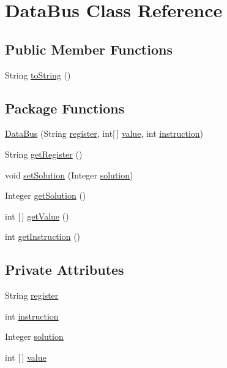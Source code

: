 \hypertarget{class_data_bus}{}\section{Data\+Bus Class Reference}
\label{class_data_bus}
\subsection*{Public Member Functions}
\begin{DoxyCompactItemize}
\item 
String \mbox{\hyperlink{class_data_bus_a9c365db4495bd6ea2f6391cd7b1b03d7}{to\+String}} ()
\end{DoxyCompactItemize}
\subsection*{Package Functions}
\begin{DoxyCompactItemize}
\item 
\mbox{\hyperlink{class_data_bus_a0cc70dfa4640ba5fd075b6c6ecb58136}{Data\+Bus}} (String \mbox{\hyperlink{class_data_bus_afd480f15b307b1c64e3511d363a4de29}{register}}, int\mbox{[}$\,$\mbox{]} \mbox{\hyperlink{class_data_bus_a19d6a0a609bf5e25c4fee2f1d21454d3}{value}}, int \mbox{\hyperlink{class_data_bus_a218abec8c222ce33ebf92c402de80541}{instruction}})
\item 
String \mbox{\hyperlink{class_data_bus_a999aeccf1731eb4f93af2ce38bce9f03}{get\+Register}} ()
\item 
void \mbox{\hyperlink{class_data_bus_a6843337471ebfcff30de95ade080073a}{set\+Solution}} (Integer \mbox{\hyperlink{class_data_bus_a5d1fa383cfa9f7d575d535cc16673d69}{solution}})
\item 
Integer \mbox{\hyperlink{class_data_bus_a5b660e1518f1460aad5a1219a668c400}{get\+Solution}} ()
\item 
int \mbox{[}$\,$\mbox{]} \mbox{\hyperlink{class_data_bus_a79d21b045c4657cf561f65c06e13b3e4}{get\+Value}} ()
\item 
int \mbox{\hyperlink{class_data_bus_a17ed7bfb3af6a205aa9b0ce056ff0616}{get\+Instruction}} ()
\end{DoxyCompactItemize}
\subsection*{Private Attributes}
\begin{DoxyCompactItemize}
\item 
String \mbox{\hyperlink{class_data_bus_afd480f15b307b1c64e3511d363a4de29}{register}}
\item 
int \mbox{\hyperlink{class_data_bus_a218abec8c222ce33ebf92c402de80541}{instruction}}
\item 
Integer \mbox{\hyperlink{class_data_bus_a5d1fa383cfa9f7d575d535cc16673d69}{solution}}
\item 
int \mbox{[}$\,$\mbox{]} \mbox{\hyperlink{class_data_bus_a19d6a0a609bf5e25c4fee2f1d21454d3}{value}}
\end{DoxyCompactItemize}


